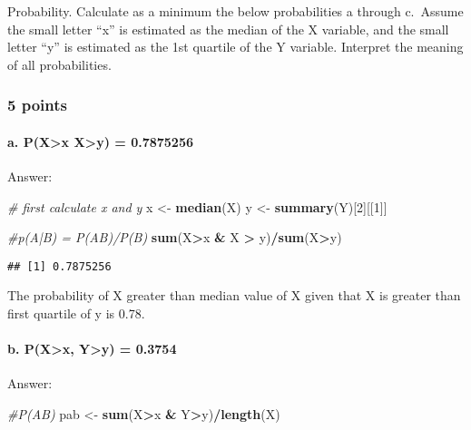 \documentclass[]{article}
\newenvironment{Shaded}{\begin{snugshade}}{\end{snugshade}}
\newcommand{\CommentTok}[1]{\textcolor[rgb]{0.56,0.35,0.01}{\textit{#1}}}
\newcommand{\DecValTok}[1]{\textcolor[rgb]{0.00,0.00,0.81}{#1}}
\newcommand{\KeywordTok}[1]{\textcolor[rgb]{0.13,0.29,0.53}{\textbf{#1}}}
\newcommand{\NormalTok}[1]{#1}
\newcommand{\OperatorTok}[1]{\textcolor[rgb]{0.81,0.36,0.00}{\textbf{#1}}}
\newcommand{\StringTok}[1]{\textcolor[rgb]{0.31,0.60,0.02}{#1}}
\let\oldparagraph\paragraph
\renewcommand{\paragraph}[1]{\oldparagraph{#1}\mbox{}}
\begin{document}
Probability. Calculate as a minimum the below probabilities a through
c.~Assume the small letter ``x'' is estimated as the median of the X
variable, and the small letter ``y'' is estimated as the 1st quartile of
the Y variable. Interpret the meaning of all probabilities.

\hypertarget{points}{%
\subsubsection{5 points}\label{points}}

\hypertarget{a.-pxx-xy-0.7875256}{%
\paragraph{a. P(X\textgreater{}x \textbar{} X\textgreater{}y) =
0.7875256}\label{a.-pxx-xy-0.7875256}}

Answer:

\begin{Shaded}
\begin{Highlighting}[]
\CommentTok{# first calculate x and y}
\NormalTok{x <-}\StringTok{ }\KeywordTok{median}\NormalTok{(X)}
\NormalTok{y <-}\StringTok{ }\KeywordTok{summary}\NormalTok{(Y)[}\DecValTok{2}\NormalTok{][[}\DecValTok{1}\NormalTok{]]}


\CommentTok{#p(A|B) = P(AB)/P(B)}
\KeywordTok{sum}\NormalTok{(X}\OperatorTok{>}\NormalTok{x }\OperatorTok{&}\StringTok{ }\NormalTok{X }\OperatorTok{>}\StringTok{ }\NormalTok{y)}\OperatorTok{/}\KeywordTok{sum}\NormalTok{(X}\OperatorTok{>}\NormalTok{y)}
\end{Highlighting}
\end{Shaded}

\begin{verbatim}
## [1] 0.7875256
\end{verbatim}

The probability of X greater than median value of X given that X is
greater than first quartile of y is 0.78.

\hypertarget{b.-pxx-yy-0.3754}{%
\paragraph{b. P(X\textgreater{}x, Y\textgreater{}y) =
0.3754}\label{b.-pxx-yy-0.3754}}

Answer:

\begin{Shaded}
\begin{Highlighting}[]
\CommentTok{#P(AB)}
\NormalTok{pab <-}\StringTok{ }\KeywordTok{sum}\NormalTok{(X}\OperatorTok{>}\NormalTok{x }\OperatorTok{&}\StringTok{ }\NormalTok{Y}\OperatorTok{>}\NormalTok{y)}\OperatorTok{/}\KeywordTok{length}\NormalTok{(X)}
\end{Highlighting}
\end{Shaded}
\end{document}
